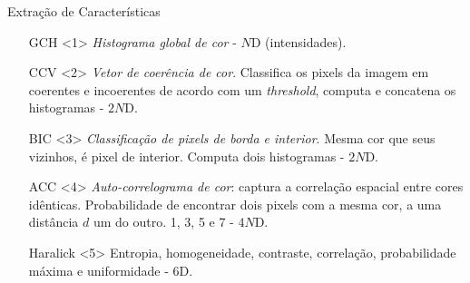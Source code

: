 \documentclass{beamer}
\begin{document}
\begin{frame}{Extração de Características}
\setlength\leftmargini{1.5em}
\begin{itemize}
\item[GCH]<1> {\emph{Histograma global de cor} - $N$D (intensidades).} %

\item[CCV]<2> {\emph{Vetor de coerência de cor}. Classifica os pixels da imagem em coerentes e incoerentes de acordo com um \textit{threshold}, computa e concatena os histogramas - $2N$D.}

\item[BIC]<3> {\emph{Classificação de pixels de borda e interior}. Mesma cor que seus vizinhos, é pixel de interior. Computa dois histogramas - $2N$D.}

\item[ACC]<4> {\emph{Auto-correlograma de cor}: captura a correlação espacial entre cores idênticas. Probabilidade de encontrar dois pixels com a mesma cor, a uma distância $d$ um do outro. 1, 3, 5 e 7 - $4N$D.}

\item[Haralick]<5> {Entropia, homogeneidade, contraste, correlação, probabilidade máxima e uniformidade - 6D.}
\end{itemize}
\end{frame}
\end{document}
